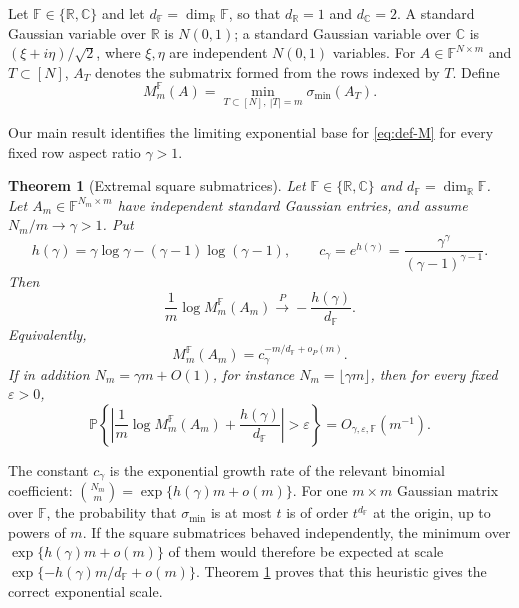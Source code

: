 \documentclass[preprint,12pt]{elsarticle}
\newtheorem{theorem}{Theorem}[section]
\newcommand{\R}{\mathbb{R}}
\newcommand{\C}{\mathbb{C}}
\newcommand{\F}{\mathbb{F}}
\newcommand{\PP}{\mathbb{P}}
\begin{document}
Let $\F\in\{\R,\C\}$ and let $d_\F=\dim_\R\F$, so that $d_\R=1$ and $d_\C=2$. A standard Gaussian
variable over $\R$ is $N(0,1)$; a standard Gaussian variable over $\C$ is $(\xi+i\eta)/\sqrt2$, where
$\xi,\eta$ are independent $N(0,1)$ variables. For $A\in\F^{N\times m}$ and $T\subset[N]$, $A_T$
denotes the submatrix formed from the rows indexed by $T$. Define
\begin{equation}\label{eq:def-M}
  M_m^\F(A)=\min_{T\subset[N],\ |T|=m}\sigma_{\min}(A_T).
\end{equation}

Our main result identifies the limiting exponential base for \eqref{eq:def-M} for every fixed row
aspect ratio $\gamma>1$.

\begin{theorem}[Extremal square submatrices]\label{thm:general}
Let $\F\in\{\R,\C\}$ and $d_\F=\dim_\R\F$. Let $A_m\in\F^{N_m\times m}$ have independent standard
Gaussian entries, and assume $N_m/m\to\gamma>1$. Put
\begin{equation}\label{eq:hgamma}
  h(\gamma)=\gamma\log\gamma-(\gamma-1)\log(\gamma-1),
  \qquad c_\gamma=e^{h(\gamma)}=\frac{\gamma^\gamma}{(\gamma-1)^{\gamma-1}}.
\end{equation}
Then
\begin{equation}\label{eq:main-limit}
  \frac{1}{m}\log M_m^\F(A_m) \xrightarrow{P} -\frac{h(\gamma)}{d_\F}.
\end{equation}
Equivalently,
\begin{equation}\label{eq:base}
  M_m^\F(A_m)=c_\gamma^{-m/d_\F+o_P(m)}.
\end{equation}
If in addition $N_m=\gamma m+O(1)$, for instance $N_m=\lfloor\gamma m\rfloor$, then for every fixed
$\varepsilon>0$,
\begin{equation}\label{eq:rate}
  \PP\left\{\left|\frac{1}{m}\log M_m^\F(A_m)+\frac{h(\gamma)}{d_\F}\right|>\varepsilon\right\}
  =O_{\gamma,\varepsilon,\F}(m^{-1}).
\end{equation}
\end{theorem}

The constant $c_\gamma$ is the exponential growth rate of the relevant binomial coefficient:
$\binom{N_m}{m}=\exp\{h(\gamma)m+o(m)\}$. For one $m\times m$ Gaussian matrix over $\F$, the
probability that $\sigma_{\min}$ is at most $t$ is of order $t^{d_\F}$ at the origin, up to powers of
$m$. If the square submatrices behaved independently, the minimum over $\exp\{h(\gamma)m+o(m)\}$ of
them would therefore be expected at scale $\exp\{-h(\gamma)m/d_\F+o(m)\}$. Theorem \ref{thm:general}
proves that this heuristic gives the correct exponential scale.
\end{document}
